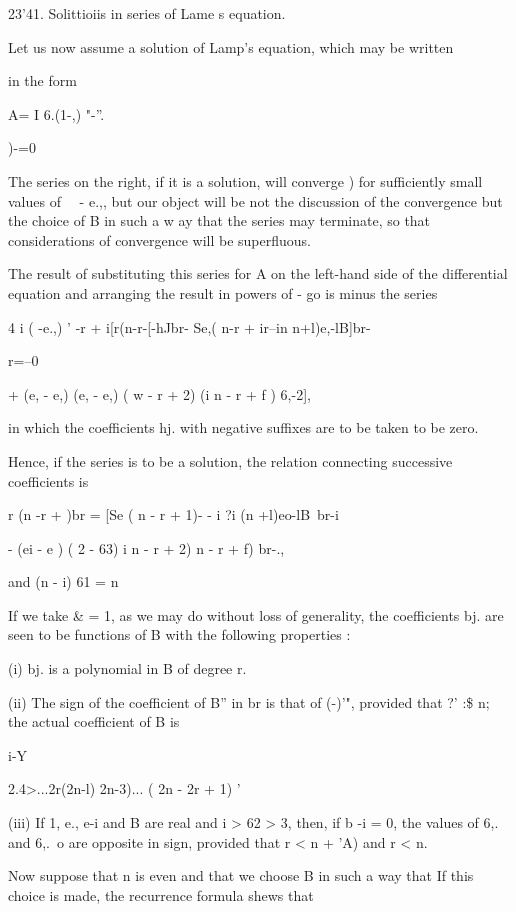 {{{{23'41. Solittioiis in series of Lame s equation.

Let us now assume a solution of Lamp's equation, which may be written

in the form

A= I 6.(1-,) "-''.

)-=0

The series on the right, if it is a solution, will converge )
for sufficiently small values of \ \ - e.,, but our object will be
not the discussion of the convergence but the choice of B in such a w
ay that the series may terminate, so that considerations of
convergence will be superfluous.

The result of substituting this series for A on the left-hand side of
the differential equation and arranging the result in powers of - go
is minus the series

4 i ( -e.,) ' -r + i[r(n-r-[-hJbr- Se,( n-r + ir--in n+l)e,-lB]br-

r=--0

+ (e, - e,) (e, - e,) ( w - r + 2) (i n - r + f ) 6,-2],

in which the coefficients hj. with negative suffixes are to be taken
to be zero.

Hence, if the series is to be a solution, the relation connecting
successive coefficients is

r (n -r + )br = [Se ( n - r + 1)- - i ?i (n +l)eo-lB\ br-i

- (ei - e ) ( 2 - 63) i n - r + 2) n - r + f) br-.,

and (n - i) 61 = n%

If we take \& = 1, as we may do without loss of generality, the
coefficients bj. are seen to be functions of B with the following
properties :

(i) bj. is a polynomial in B of degree r.

(ii) The sign of the coefficient of B'' in br is that of (-)'",
provided that ?' :\$ n; the actual coefficient of B is

i-Y

2.4>...2r(2n-l) 2n-3)... ( 2n - 2r + 1) '

(iii) If 1, e., e-i and B are real and i > 62 > 3, then, if b -i = 0,
the values of 6,. and 6,.\ o are opposite in sign, provided that r < n
+ 'A) and r < n.

Now suppose that n is even and that we choose B in such a way that If
this choice is made, the recurrence formula shews that

}}}}
